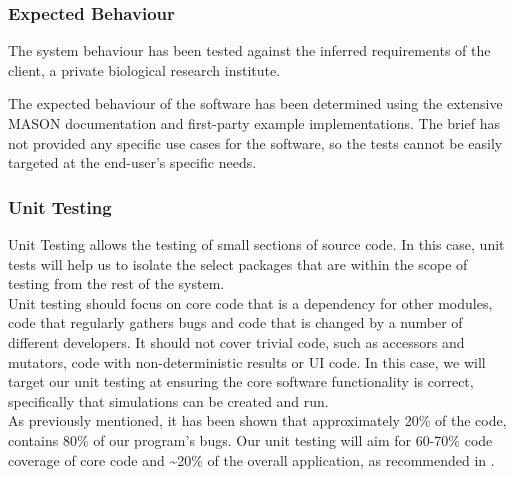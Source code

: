 \documentclass[11pt]{article}
\begin{document}

\subsubsection{Expected Behaviour}
The system behaviour has been tested against the inferred requirements of the client, a private biological research institute.

The expected behaviour of the software has been determined using the extensive MASON documentation\cite{mason_doc} and first-party example implementations.
The brief has not provided any specific use cases for the software, so the tests cannot be easily targeted at the end-user's specific needs.


\subsubsection{Unit Testing}
Unit Testing allows the testing of small sections of source code.
In this case, unit tests will help us to isolate the select packages that are within the scope of testing from the rest of the system.
\\

Unit testing should focus on core code that is a dependency for other modules, code that regularly gathers bugs and code that is changed by a number of different developers.
It should not cover trivial code, such as accessors and mutators, code with non-deterministic results or UI code.\cite{dont_test_blindly}
In this case, we will target our unit testing at ensuring the core software functionality is correct, specifically that simulations can be created and run.
\\

As previously mentioned, it has been shown that approximately 20\% of the code, contains 80\% of our program's bugs.
Our unit testing will aim for 60-70\% code coverage of core code and \textasciitilde 20\% of the overall application, as recommended in \cite{dont_test_blindly}.
\end{document}
